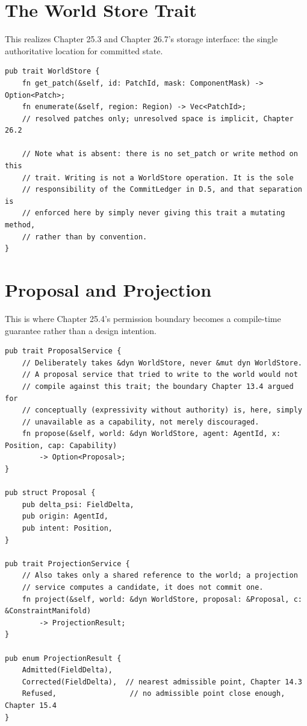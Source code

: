 \section{The World Store Trait}

This realizes Chapter 25.3 and Chapter 26.7's storage interface: the single authoritative location for committed state.

\begin{Verbatim}[breaklines=true, breaksymbolleft={}, fontsize=\small]
pub trait WorldStore {
    fn get_patch(&self, id: PatchId, mask: ComponentMask) -> Option<Patch>;
    fn enumerate(&self, region: Region) -> Vec<PatchId>;
    // resolved patches only; unresolved space is implicit, Chapter 26.2

    // Note what is absent: there is no set_patch or write method on this
    // trait. Writing is not a WorldStore operation. It is the sole
    // responsibility of the CommitLedger in D.5, and that separation is
    // enforced here by simply never giving this trait a mutating method,
    // rather than by convention.
}
\end{Verbatim}

\section{Proposal and Projection}

This is where Chapter 25.4's permission boundary becomes a compile-time guarantee rather than a design intention.

\begin{Verbatim}[breaklines=true, breaksymbolleft={}, fontsize=\small]
pub trait ProposalService {
    // Deliberately takes &dyn WorldStore, never &mut dyn WorldStore.
    // A proposal service that tried to write to the world would not
    // compile against this trait; the boundary Chapter 13.4 argued for
    // conceptually (expressivity without authority) is, here, simply
    // unavailable as a capability, not merely discouraged.
    fn propose(&self, world: &dyn WorldStore, agent: AgentId, x: Position, cap: Capability)
        -> Option<Proposal>;
}

pub struct Proposal {
    pub delta_psi: FieldDelta,
    pub origin: AgentId,
    pub intent: Position,
}

pub trait ProjectionService {
    // Also takes only a shared reference to the world; a projection
    // service computes a candidate, it does not commit one.
    fn project(&self, world: &dyn WorldStore, proposal: &Proposal, c: &ConstraintManifold)
        -> ProjectionResult;
}

pub enum ProjectionResult {
    Admitted(FieldDelta),
    Corrected(FieldDelta),  // nearest admissible point, Chapter 14.3
    Refused,                 // no admissible point close enough, Chapter 15.4
}
\end{Verbatim}

